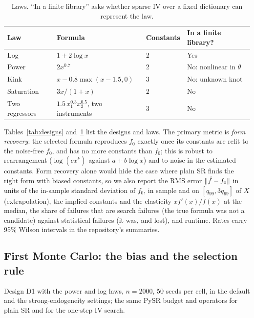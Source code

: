 \begin{table}[ht]
\centering\small
\caption{Laws. ``In a finite library'' asks whether sparse IV over a fixed dictionary can represent the law.}
\label{tab:laws}
\begin{tabular}{@{}llll@{}}
\toprule
Law & Formula & Constants & In a finite library? \\
\midrule
Log & $1 + 2\log x$ & 2 & Yes \\
Power & $2x^{0.7}$ & 2 & No: nonlinear in $\theta$ \\
Kink & $x - 0.8\max(x - 1.5, 0)$ & 3 & No: unknown knot \\
Saturation & $3x/(1 + x)$ & 2 & No \\
Two regressors & $1.5\,x_1^{0.3}x_2^{0.5}$, two instruments & 3 & No \\
\bottomrule
\end{tabular}
\end{table}

Tables~\ref{tab:designs} and~\ref{tab:laws} list the designs and laws. The primary metric is \emph{form recovery}: the selected formula reproduces $f_0$ exactly once its constants are refit to the noise-free $f_0$, and has no more constants than $f_0$; this is robust to rearrangement ($\log(cx^k)$ against $a + b\log x$) and to noise in the estimated constants. Form recovery alone would hide the case where plain SR finds the right form with biased constants, so we also report the RMS error $\lVert \hat f - f_0\rVert$ in units of the in-sample standard deviation of $f_0$, in sample and on $[q_{99}, 3q_{99}]$ of $X$ (extrapolation), the implied constants and the elasticity $xf'(x)/f(x)$ at the median, the share of failures that are search failures (the true formula was not a candidate) against statistical failures (it was, and lost), and runtime. Rates carry 95\% Wilson intervals in the repository's summaries.

\subsection{First Monte Carlo: the bias and the selection rule}
\label{sec:mc-first}

Design D1 with the power and log laws, $n = 2000$, 50 seeds per cell, in the default and the strong-endogeneity settings; the same PySR budget and operators for plain SR and for the one-step IV search.

